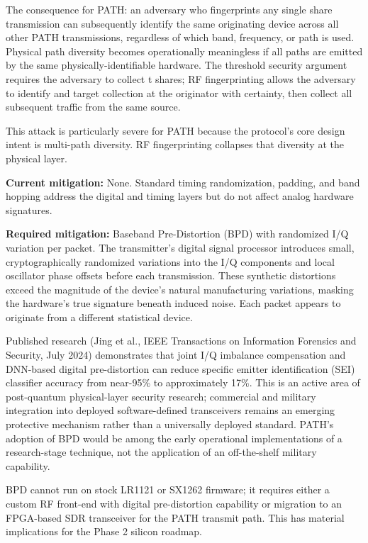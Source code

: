 \documentclass[
  11pt,
]{article}
\begin{document}
The consequence for PATH: an adversary who fingerprints any single share
transmission can subsequently identify the same originating device
across all other PATH transmissions, regardless of which band,
frequency, or path is used. Physical path diversity becomes
operationally meaningless if all paths are emitted by the same
physically-identifiable hardware. The threshold security argument
requires the adversary to collect t shares; RF fingerprinting allows the
adversary to identify and target collection at the originator with
certainty, then collect all subsequent traffic from the same source.

This attack is particularly severe for PATH because the protocol's core
design intent is multi-path diversity. RF fingerprinting collapses that
diversity at the physical layer.

\textbf{Current mitigation:} None. Standard timing randomization,
padding, and band hopping address the digital and timing layers but do
not affect analog hardware signatures.

\textbf{Required mitigation:} Baseband Pre-Distortion (BPD) with
randomized I/Q variation per packet. The transmitter's digital signal
processor introduces small, cryptographically randomized variations into
the I/Q components and local oscillator phase offsets before each
transmission. These synthetic distortions exceed the magnitude of the
device's natural manufacturing variations, masking the hardware's true
signature beneath induced noise. Each packet appears to originate from a
different statistical device.

Published research (Jing et al., IEEE Transactions on Information
Forensics and Security, July 2024) demonstrates that joint I/Q imbalance
compensation and DNN-based digital pre-distortion can reduce specific
emitter identification (SEI) classifier accuracy from near-95\% to
approximately 17\%. This is an active area of post-quantum
physical-layer security research; commercial and military integration
into deployed software-defined transceivers remains an emerging
protective mechanism rather than a universally deployed standard. PATH's
adoption of BPD would be among the early operational implementations of
a research-stage technique, not the application of an off-the-shelf
military capability.

BPD cannot run on stock LR1121 or SX1262 firmware; it requires either a
custom RF front-end with digital pre-distortion capability or migration
to an FPGA-based SDR transceiver for the PATH transmit path. This has
material implications for the Phase 2 silicon roadmap.
\end{document}
